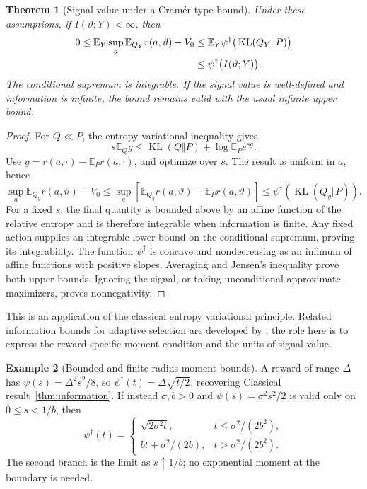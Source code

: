 \documentclass[11pt]{article}
\theoremstyle{plain}
\newtheorem{theorem}{Theorem}[section]
\theoremstyle{definition}
\newtheorem{example}[theorem]{Example}
\theoremstyle{remark}
\newcommand{\E}{\mathbb E}
\DeclareMathOperator{\KL}{KL}
\begin{document}
\begin{theorem}[Signal value under a Cram\'er-type bound]
\label{thm:cramerinformation}
Under these assumptions, if \(I(\vartheta;Y)<\infty\), then
\begin{align}
0\le\E_Y\sup_a\E_{Q_Y}r(a,\vartheta)-V_0
&\le\E_Y\psi^\dagger\big(\KL(Q_Y\Vert P)\big)\notag\\
&\le\psi^\dagger\big(I(\vartheta;Y)\big).
\label{eq:cramerinformation}
\end{align}
The conditional supremum is integrable. If the signal value is
well-defined and information is infinite, the bound remains valid
with the usual infinite upper bound.
\end{theorem}
\begin{proof}
For \(Q\ll P\), the entropy variational inequality gives
\[
s\E_Q g\le\KL(Q\Vert P)+\log\E_Pe^{sg}.
\]
Use \(g=r(a,\cdot)-\E_Pr(a,\cdot)\), and optimize over \(s\).
The result is uniform in \(a\), hence
\[
\sup_a\E_{Q_y}r(a,\vartheta)-V_0
\le\sup_a[\E_{Q_y}r(a,\vartheta)-\E_Pr(a,\vartheta)]
\le\psi^\dagger(\KL(Q_y\Vert P)).
\]
For a fixed \(s\), the final quantity is bounded above by an affine
function of the relative entropy and is therefore integrable when
information is finite. Any fixed action supplies an integrable lower
bound on the conditional supremum, proving its integrability.
The function \(\psi^\dagger\) is concave and nondecreasing as an
infimum of affine functions with positive slopes. Averaging and Jensen's
inequality prove both upper bounds. Ignoring the signal, or taking
unconditional approximate maximizers, proves nonnegativity.
\end{proof}

This is an application of the classical entropy variational principle.
Related information bounds for adaptive selection are developed by
\citet{RussoZou2016}; the role here is to express the reward-specific
moment condition and the units of signal value.

\begin{example}[Bounded and finite-radius moment bounds]
A reward of range \(\Delta\) has
\(\psi(s)=\Delta^2s^2/8\), so
\(\psi^\dagger(t)=\Delta\sqrt{t/2}\), recovering
Classical result~\ref{thm:information}. If instead \(\sigma,b>0\) and
\(\psi(s)=\sigma^2s^2/2\) is valid only on \(0\le s<1/b\), then
\[
\psi^\dagger(t)=
\begin{cases}
\sqrt{2\sigma^2t},&t\le\sigma^2/(2b^2),\\
bt+\sigma^2/(2b),&t>\sigma^2/(2b^2).
\end{cases}
\]
The second branch is the limit as \(s\uparrow1/b\); no exponential
moment at the boundary is needed.
\end{example}
\end{document}
